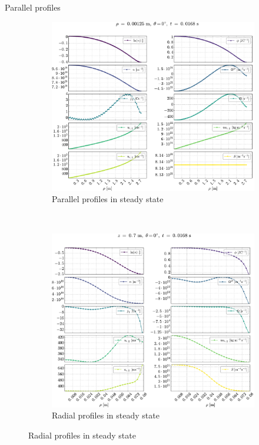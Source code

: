 Parallel profiles
%
\begin{figure}[htbp]
    \centering
    \begin{subfigure}[h]{1.00\textwidth}
        \centering
        \includegraphics[width=1.0\textwidth]{fig/results/1DProfiles/B010Par}
        \caption{Parallel profiles in steady state}
        \label{fig:parProfs}
    \end{subfigure}%
    \\
    \begin{subfigure}[h]{1.00\textwidth}
        \centering
        \includegraphics[width=1.0\textwidth]{fig/results/1DProfiles/B010Rad}
        \caption{Radial profiles in steady state}
        \label{fig:radProfs}
    \end{subfigure}
\end{figure}

